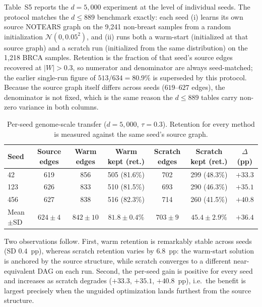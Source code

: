 \documentclass[11pt]{article}
\begin{document}
Table~S5 reports the $d=5{,}000$ experiment at the level of individual seeds. The
protocol matches the $d\le889$ benchmark exactly: each seed (i) learns its own source
NOTEARS graph on the 9,241 non-breast samples from a random initialization
$\mathcal{N}(0,0.05^2)$, and (ii) runs both a warm-start (initialized at that source
graph) and a scratch run (initialized from the same distribution) on the 1,218 BRCA
samples. Retention is the fraction of that seed's source edges recovered at
$|W|>0.3$, so numerator and denominator are always seed-matched; the earlier single-run
figure of $513/634=80.9\%$ is superseded by this protocol. Because the source graph
itself differs across seeds ($619$--$627$ edges), the denominator is not fixed, which is
the same reason the $d\le889$ tables carry non-zero variance in both columns.

\setcounter{table}{4}
\begin{table}[h]
\small
\caption{Per-seed genome-scale transfer ($d=5{,}000$, $\tau=0.3$). Retention for every
method is measured against the same seed's source graph.}
\begin{tabular}{@{}lcccccc@{}}
\toprule
Seed & Source edges & Warm edges & Warm kept (ret.) & Scratch edges & Scratch kept (ret.) & $\Delta$ (pp)\\
\midrule
42  & 619 & 856 & 505 (81.6\%) & 702 & 299 (48.3\%) & $+33.3$\\
123 & 626 & 833 & 510 (81.5\%) & 693 & 290 (46.3\%) & $+35.1$\\
456 & 627 & 838 & 516 (82.3\%) & 714 & 260 (41.5\%) & $+40.8$\\
\midrule
Mean$\pm$SD & $624\pm4$ & $842\pm10$ & $81.8\pm0.4$\% & $703\pm9$ & $45.4\pm2.9$\% & $+36.4$\\
\bottomrule
\end{tabular}
\label{tab:S5genome}
\end{table}

Two observations follow. First, warm retention is remarkably stable across seeds
(SD $0.4$~pp), whereas scratch retention varies by $6.8$~pp: the warm-start solution is
anchored by the source structure, while scratch converges to a different near-equivalent
DAG on each run. Second, the per-seed gain is positive for every seed and increases as
scratch degrades ($+33.3$, $+35.1$, $+40.8$~pp), i.e.\ the benefit is largest precisely
when the unguided optimization lands furthest from the source structure.
\end{document}
